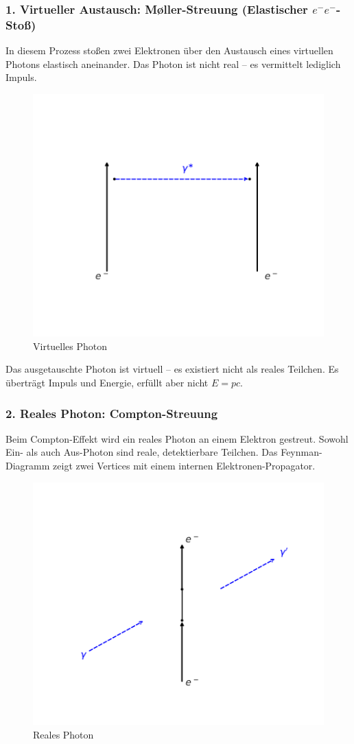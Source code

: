\subsubsection*{1. Virtueller Austausch: Møller-Streuung (Elastischer $e^-e^-$-Stoß)}
In diesem Prozess stoßen zwei Elektronen über den Austausch eines virtuellen Photons elastisch aneinander. Das Photon ist nicht real – es vermittelt lediglich Impuls.
\begin{figure}[H]
	\begin{center}
		\includegraphics[width=0.42\linewidth]{bilder/moeller-diagramm.pdf}
	\end{center}
	\caption{Virtuelles Photon}
\end{figure}


\begin{tcolorbox}[physikbox, title=Virtuelles Photon]
	\label{box:virtuelles Photon}
	Das ausgetauschte Photon ist virtuell – es existiert nicht als reales Teilchen. Es überträgt Impuls und Energie, erfüllt aber nicht $E = pc$.
\end{tcolorbox}
\subsubsection*{2. Reales Photon: Compton-Streuung}
Beim Compton-Effekt wird ein reales Photon an einem Elektron gestreut. Sowohl Ein- als auch Aus-Photon sind reale, detektierbare Teilchen. Das Feynman-Diagramm zeigt zwei Vertices mit einem internen Elektronen-Propagator.

\begin{figure}[H]
	\begin{center}
		\includegraphics[width=0.5\linewidth]{bilder/compton-diagramm.pdf}
	\end{center}
	\caption{Reales Photon}
\end{figure}

